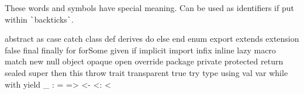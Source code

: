 \documentclass[article, a5paper]{memoir}
\newcommand{\LangColor}{scalared}
\newcommand{\head}[1]{{\bfseries {\color{\LangColor}{#1}}\par\vspace{1mm}\hrule\vspace{-2mm}}}
\newcommand{\Newline}{\vspace{\baselineskip}}
\begin{document}
\Newline\vspace*{-0.5em}\head{Reserved words in Scala}\Newline
{\small These words and symbols have special meaning. Can be used as identifiers if put within \verb|`|backticks\verb|`|.}
\vspace*{-0.5em}
\begin{Code}[morekeywords={macro,\_},otherkeywords={>,<-,\%,<,>:,@,:,=,\#},basicstyle=\ttfamily\fontsize{8}{9}\selectfont]
abstract as case catch class def derives do else end enum export extends extension false 
final finally for forSome given if implicit import infix inline lazy macro match new null 
object opaque open override package private protected return sealed super then this throw 
trait transparent true try type using val var while with yield
 _   :   =   =>   <-   <:   <%
\end{Code}



\clearpage
\end{document}

